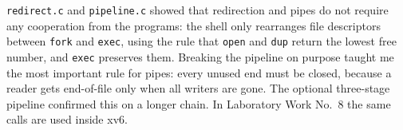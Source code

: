 \documentclass[12pt,a4paper]{article}
\begin{document}
\texttt{redirect.c} and \texttt{pipeline.c} showed that redirection and pipes do not require any cooperation from the programs: the shell only rearranges file descriptors between \texttt{fork} and \texttt{exec}, using the rule that \texttt{open} and \texttt{dup} return the lowest free number, and \texttt{exec} preserves them. Breaking the pipeline on purpose taught me the most important rule for pipes: every unused end must be closed, because a reader gets end-of-file only when all writers are gone. The optional three-stage pipeline confirmed this on a longer chain. In Laboratory Work No.~8 the same calls are used inside xv6.
\end{document}
